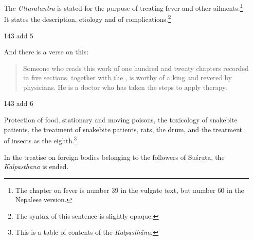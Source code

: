 \begin{translation}
The \emph{Uttaratantra} is stated for the purpose of treating fever
and other ailments.\footnote{The chapter on fever is number 39 in the
    vulgate text, but number 60 in the Nepalese version.} It states the
    description, etiology and  of
    complications.\footnote{The syntax of this sentence is slightly
        opaque.}

\item[143 add 5]

And there is a verse on this:

\begin{quote}
    Someone who reads this work of one hundred and twenty chapters
recorded in five sections, together with the
, is worthy of a king and revered by
physicians. He is a doctor who has taken the steps to apply
therapy.
\end{quote}

\item [143 add 6]

Protection of food, stationary and moving poisons, the toxicology of
snakebite patients, the treatment of snakebite patients, rats, the
drum, and the treatment of insects as the eighth.\footnote{This
    is a table of contents of the \emph{Kalpasthāna}.}

\bigskip


\begin{center}
    In the treatise on foreign bodies belonging to the followers of Suśruta, the 
\emph{Kalpasthāna} is ended.

\end{center} 
\end{translation}
